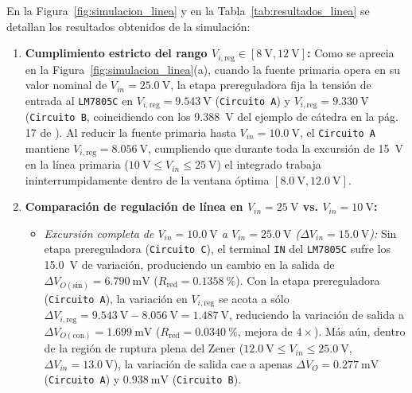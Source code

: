 En la Figura~\ref{fig:simulacion_linea} y en la Tabla~\ref{tab:resultados_linea} se detallan los resultados obtenidos de la simulación:
\begin{enumerate}
    \item \textbf{Cumplimiento estricto del rango $V_{i,\text{reg}} \in [\SI{8}{\volt}, \SI{12}{\volt}]$:} Como se aprecia en la Figura~\ref{fig:simulacion_linea}(a), cuando la fuente primaria opera en su valor nominal de \textbf{$V_{in} = \SI{25,0}{\volt}$}, la etapa prereguladora fija la tensión de entrada al \texttt{LM7805C} en \textbf{$V_{i,\text{reg}} = \SI{9,543}{\volt}$} (\texttt{Circuito A}) y \textbf{$V_{i,\text{reg}} = \SI{9,330}{\volt}$} (\texttt{Circuito B}, coincidiendo con los \SI{9,388}{\volt} del ejemplo de cátedra en la pág. 17 de \cite{gonzalez_p3}). Al reducir la fuente primaria hasta \textbf{$V_{in} = \SI{10,0}{\volt}$}, el \texttt{Circuito A} mantiene \textbf{$V_{i,\text{reg}} = \SI{8,056}{\volt}$}, cumpliendo que durante toda la excursión de \SI{15}{\volt} en la línea primaria ($\SI{10}{\volt} \le V_{in} \le \SI{25}{\volt}$) el integrado trabaja ininterrumpidamente dentro de la ventana óptima $[\SI{8,0}{\volt}, \SI{12,0}{\volt}]$.
    \item \textbf{Comparación de regulación de línea en $V_{in} = \SI{25}{\volt}$ vs. $V_{in} = \SI{10}{\volt}$:}
    \begin{itemize}
        \item \emph{Excursión completa de $V_{in} = \SI{10,0}{\volt}$ a $V_{in} = \SI{25,0}{\volt}$ ($\Delta V_{in} = \SI{15,0}{\volt}$):} Sin etapa prereguladora (\texttt{Circuito C}), el terminal \texttt{IN} del \texttt{LM7805C} sufre los \SI{15,0}{\volt} de variación, produciendo un cambio en la salida de $\Delta V_{O(\text{sin})} = \SI{6,790}{\milli\volt}$ ($R_{\text{red}} = \SI{0,1358}{\percent}$). Con la etapa prereguladora (\texttt{Circuito A}), la variación en $V_{i,\text{reg}}$ se acota a sólo $\Delta V_{i,\text{reg}} = \SI{9,543}{\volt} - \SI{8,056}{\volt} = \SI{1,487}{\volt}$, reduciendo la variación de salida a \textbf{$\Delta V_{O(\text{con})} = \SI{1,699}{\milli\volt}$} ($R_{\text{red}} = \SI{0,0340}{\percent}$, mejora de $4\times$). Más aún, dentro de la región de ruptura plena del Zener ($\SI{12,0}{\volt} \le V_{in} \le \SI{25,0}{\volt}$, $\Delta V_{in} = \SI{13,0}{\volt}$), la variación de salida cae a apenas \textbf{$\Delta V_O = \SI{0,277}{\milli\volt}$} (\texttt{Circuito A}) y \textbf{$\SI{0,938}{\milli\volt}$} (\texttt{Circuito B}).

\end{itemize}
\end{enumerate}
